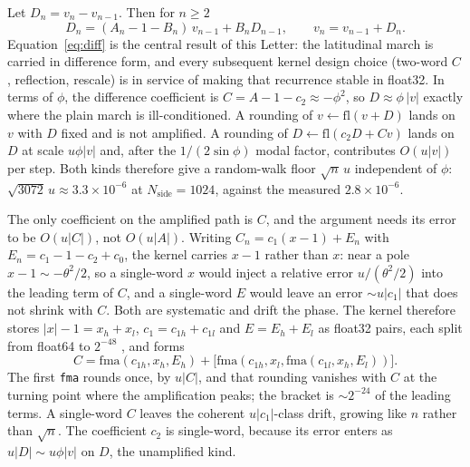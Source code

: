 \documentclass[letters,usenatbib,useAMS]{mnras}
\begin{document}
Let $D_n=v_n-v_{n-1}$. Then for $n\ge2$
\begin{equation}
\label{eq:diff}
  D_n=(A_n-1-B_n)\,v_{n-1}+B_n D_{n-1},\qquad v_n=v_{n-1}+D_n.
\end{equation}
Equation~\eqref{eq:diff} is the central result of this Letter: the latitudinal march is carried in difference form, and every subsequent kernel design choice (two-word $C$, reflection, rescale) is in service of making that recurrence stable in float32.
In terms of $\phi$, the difference coefficient is $C=A-1-c_2\approx-\phi^2$, so $D\approx\phi\,\lvert v\rvert$ exactly where the plain march is ill-conditioned. A rounding of $v\leftarrow\mathrm{fl}(v+D)$ lands on $v$ with $D$ fixed and is not amplified. A rounding of $D\leftarrow\mathrm{fl}(c_2 D+C v)$ lands on $D$ at scale $u\phi\lvert v\rvert$ and, after the $1/(2\sin\phi)$ modal factor, contributes $O(u\lvert v\rvert)$ per step. Both kinds therefore give a random-walk floor $\sqrt{n}\,u$ independent of $\phi$: $\sqrt{3072}\,u\approx3.3\times10^{-6}$ at $N_{\mathrm{side}}=1024$, against the measured $2.8\times10^{-6}$.

The only coefficient on the amplified path is $C$, and the argument needs its error to be $O(u\lvert C\rvert)$, not $O(u\lvert A\rvert)$. Writing $C_n=c_1(x-1)+E_n$ with $E_n=c_1-1-c_2+c_0$, the kernel carries $x-1$ rather than $x$: near a pole $x-1\sim-\theta^2/2$, so a single-word $x$ would inject a relative error $u/(\theta^2/2)$ into the leading term of $C$, and a single-word $E$ would leave an error $\sim u\lvert c_1\rvert$ that does not shrink with $C$. Both are systematic and drift the phase. The kernel therefore stores $\lvert x\rvert-1=x_h+x_l$, $c_1=c_{1h}+c_{1l}$ and $E=E_h+E_l$ as float32 pairs, each split from float64 to $2^{-48}$ \citep{dekker1971}, and forms
\begin{equation}
\label{eq:Cfma}
  C=\mathrm{fma}(c_{1h},x_h,E_h)+\bigl[\mathrm{fma}(c_{1h},x_l,\mathrm{fma}(c_{1l},x_h,E_l))\bigr].
\end{equation}
The first \texttt{fma} rounds once, by $u\lvert C\rvert$, and that rounding vanishes with $C$ at the turning point where the amplification peaks; the bracket is $\sim2^{-24}$ of the leading terms. A single-word $C$ leaves the coherent $u\lvert c_1\rvert$-class drift, growing like $n$ rather than $\sqrt n$. The coefficient $c_2$ is single-word, because its error enters as $u\lvert D\rvert\sim u\phi\lvert v\rvert$ on $D$, the unamplified kind.
\end{document}

